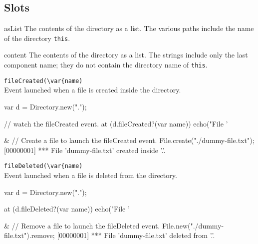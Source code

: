 \subsection{Slots}
\begin{urbiscriptapi}
\item[asList]
  The contents of the directory as a  list.  The
  various paths include the name of the directory \lstinline|this|.

\item[content]
  The contents of the directory as a  list.  The
  strings include only the last component name; they do not contain
  the directory name of \lstinline|this|.

\item \lstinline|fileCreated(\var{name)|\\
  Event launched when a file is created inside the directory.

\begin{urbiscript}
{
  var d = Directory.new(".");

  // watch the fileCreated event.
  at (d.fileCreated?(var name))
    echo("File '%
}
&
  // Create a file to launch the fileCreated event.
  File.create("./dummy-file.txt");
[00000001] *** File 'dummy-file.txt' created inside '.'.
\end{urbiscript}

\item \lstinline|fileDeleted(\var{name)|\\
  Event launched when a file is deleted from the directory.

\begin{urbiscript}
{
  var d = Directory.new(".");

  at (d.fileDeleted?(var name))
    echo("File '%
}
&
  // Remove a file to launch the fileDeleted event.
  File.new("./dummy-file.txt").remove;
[00000001] *** File 'dummy-file.txt' deleted from '.'.
\end{urbiscript}


\end{urbiscriptapi}


